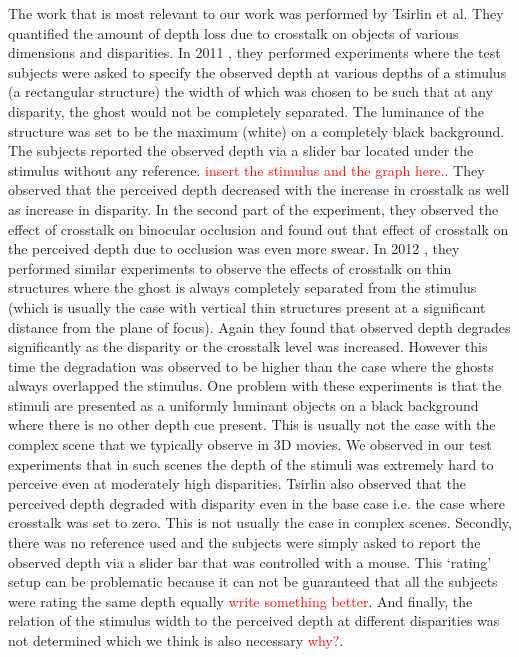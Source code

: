 The work that is most relevant to our work was performed by Tsirlin et al. They quantified the amount of depth loss due to crosstalk on objects of various dimensions and disparities. In 2011 \cite{tsirlin2011effect}, they performed experiments where the test subjects were asked to specify the observed depth at various depths of a stimulus (a rectangular structure) the width of which was chosen to be such that at any disparity, the ghost would not be completely separated. The luminance of the structure was set to be the maximum (white) on a completely black background. The subjects reported the observed depth via a slider bar located under the stimulus without any reference. \textcolor{red}{insert the stimulus and the graph here.}. They observed that the perceived depth decreased with the increase in crosstalk as well as increase in disparity. In the second part of the experiment, they observed the effect of crosstalk on binocular occlusion and found out that effect of crosstalk on the perceived depth due to occlusion was even more swear. In 2012 \cite{tsirlin2012effect}, they performed similar experiments to observe the effects of crosstalk on thin structures where the ghost is always completely separated from the stimulus (which is usually the case with vertical thin structures present at a significant distance from the plane of focus). Again they found that observed depth degrades significantly as the disparity or the crosstalk level was increased. However this time the degradation was observed to be higher than the case where the ghosts always overlapped the stimulus. One problem with these experiments is that the stimuli are presented as a uniformly luminant objects on a black background where there is no other depth cue present. This is usually not the case with the complex scene that we typically observe in 3D movies. We observed in our test experiments that in such scenes the depth of the stimuli was extremely hard to perceive even at moderately high disparities. Tsirlin also observed that the perceived depth degraded with disparity even in the base case i.e. the case where crosstalk was set to zero. This is not usually the case in complex scenes. Secondly, there was no reference used and the subjects were simply asked to report the observed depth via a slider bar that was controlled with a mouse. This `rating' setup can be problematic because it can not be guaranteed that all the subjects were rating the same depth equally \textcolor{red}{write something better}. And finally, the relation of the stimulus width to the perceived depth at different disparities was not determined which we think is also necessary \textcolor{red}{why?}.

